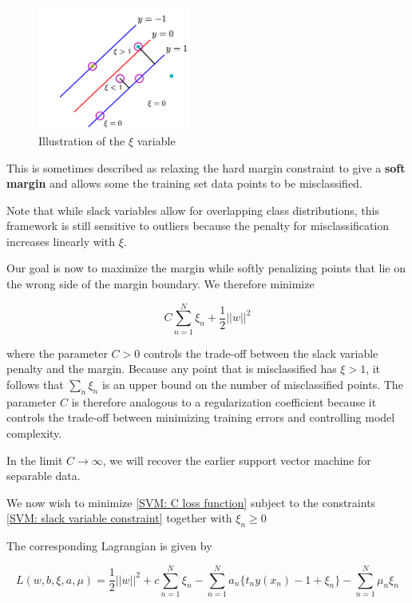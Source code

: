  
 \begin{figure}
    \centering
    \includegraphics[width=5cm]{chapter005/figures/fig005}
    \caption{Illustration of the $\xi$ variable}
\end{figure}

This is sometimes described as relaxing the hard margin constraint to give a \textbf{soft margin} and allows some the training set data points to be misclassified.

Note that while slack variables allow for overlapping class distributions, this framework is still sensitive to outliers because the penalty for misclassification increases linearly with $\xi$.

Our goal is now to maximize the margin while softly penalizing points that lie on the wrong side of the margin boundary. We therefore minimize

\begin{equation}
    \label{SVM: C loss function}
    C \sum_{n=1}^N \xi_n + \frac{1}{2} ||w||^2
\end{equation}

where the parameter $C > 0$ controls the trade-off between the slack variable penalty and the margin. Because any point that is misclassified has $\xi > 1$, it follows that $\sum_n \xi_n$ is an upper bound on the number of misclassified points. The parameter $C$ is therefore analogous to a regularization coefficient because it controls the trade-off between minimizing training errors and controlling model complexity.

In the limit $C \rightarrow \infty$, we will recover the earlier support vector machine for separable data.

We now wish to minimize \ref{SVM: C loss function} subject to the constraints \ref{SVM: slack variable constraint} together with $\xi_n \geq 0$

The corresponding Lagrangian is given by

\begin{equation}
    \label{form: SVM Lagrangian}
    L(w, b, \xi, a, \mu) = \frac{1}{2} ||w||^2 + c\sum_{n=1}^N \xi_n - \sum_{n=1}^Na_n\{t_ny(x_n) - 1 + \xi_n\} - \sum_{n=1}^N \mu_n \xi_n
\end{equation}

